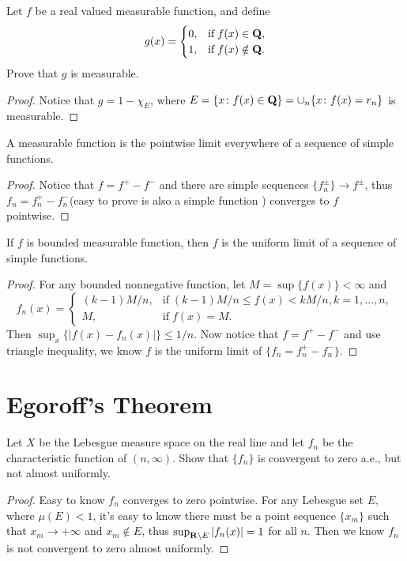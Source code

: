 \begin{pro}%
	Let $f$ be a real valued measurable function, and define
	\[g(x)=\begin{cases} 0,&\mbox{if}\;f(x)\in\mathbf{Q},\\1,&\mbox{if}\;f(x)\notin\mathbf{Q}.\end{cases}\]
	Prove that $g$ is measurable.
\end{pro}
\begin{proof}
	Notice that $g=1-\chi_E$, where $E=\{x\colon f(x)\in\mathbf{Q}\}=\cup_n \{x\colon f(x)=r_n\}$ is measurable. 
\end{proof}

\begin{pro}%
	A measurable function is the pointwise limit everywhere of a sequence of simple functions.
\end{pro}
\begin{proof}
	Notice that $f=f^+-f^-$ and there are simple sequences $\{f_n^{\pm}\}\to f^{\pm}$, thus $f_n=f_n^+-f_n^-$(easy to prove is also a simple function ) converges to $f$ pointwise.
\end{proof}

\begin{pro}%
	If $f$ is bounded measurable function, then $f$ is the uniform limit of a sequence of simple functions.
\end{pro}
\begin{proof}
	For any bounded nonnegative function, let $M=\sup\{f(x)\}<\infty$ and 
	\[f_n(x)=\begin{cases} (k-1)M/n,&\mbox{if}\;(k-1)M/n\leq f(x)<kM/n,k=1,\ldots,n,\\
	M,&\mbox{if}\;f(x)=M.\end{cases}\] 
	Then $\sup_x\{|f(x)-f_n(x)|\}\leq 1/n$. Now notice that $f=f^+-f^-$ and use triangle inequality, we know $f$ is the  uniform limit of $\{f_n=f^+_n-f^-_n\}$.
\end{proof}

\section{Egoroff's Theorem}
\begin{pro}%
	Let $X$ be the Lebesgue measure space on the real line and let $f_n$ be the characteristic function of $(n,\infty)$. Show that $\{f_n\}$ is convergent to zero a.e., but not almost uniformly.
\end{pro}
\begin{proof}
	Easy to know $f_n$ converges to zero pointwise. For any Lebesgue set $E$, where $\mu(E)<1$, it's easy to know there must be a point sequence $\{x_m\}$ such that $x_m\to +\infty$ and $x_m\notin E$, thus $\sup_{\mathbf{R}\backslash E} |f_n(x)|=1$ for all $n$. Then we know $f_n$ is not convergent to zero almost uniformly.
\end{proof}

